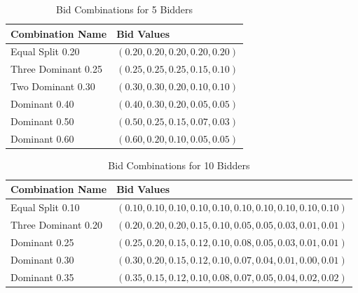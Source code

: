 \documentclass[format=acmsmall, review=false]{acmart}
\begin{document}
\begin{table}[H]
\centering
\captionsetup{skip=2pt}
\caption{Bid Combinations for 5 Bidders}
\begin{tabular}{ll}
\hline
\textbf{Combination Name} & \textbf{Bid Values} \\
\hline
Equal Split 0.20 & $(0.20, 0.20, 0.20, 0.20, 0.20)$ \\
Three Dominant 0.25 & $(0.25, 0.25, 0.25, 0.15, 0.10)$ \\
Two Dominant 0.30 & $(0.30, 0.30, 0.20, 0.10, 0.10)$ \\
Dominant 0.40 & $(0.40, 0.30, 0.20, 0.05, 0.05)$ \\
Dominant 0.50 & $(0.50, 0.25, 0.15, 0.07, 0.03)$ \\
Dominant 0.60 & $(0.60, 0.20, 0.10, 0.05, 0.05)$ \\
\hline
\end{tabular}
\label{tab:bids_5}
\end{table}

\begin{table}[H]
\centering
\captionsetup{skip=2pt}
\caption{Bid Combinations for 10 Bidders}
\begin{tabular}{ll}
\hline
\textbf{Combination Name} & \textbf{Bid Values} \\
\hline
Equal Split 0.10 & $(0.10, 0.10, 0.10, 0.10, 0.10, 0.10, 0.10, 0.10, 0.10, 0.10)$ \\
Three Dominant 0.20 & $(0.20, 0.20, 0.20, 0.15, 0.10, 0.05, 0.05, 0.03, 0.01, 0.01)$ \\
Dominant 0.25 & $(0.25, 0.20, 0.15, 0.12, 0.10, 0.08, 0.05, 0.03, 0.01, 0.01)$ \\
Dominant 0.30 & $(0.30, 0.20, 0.15, 0.12, 0.10, 0.07, 0.04, 0.01, 0.00, 0.01)$ \\
Dominant 0.35 & $(0.35, 0.15, 0.12, 0.10, 0.08, 0.07, 0.05, 0.04, 0.02, 0.02)$ \\
\hline
\end{tabular}
\label{tab:bids_10}
\end{table}
\end{document}
